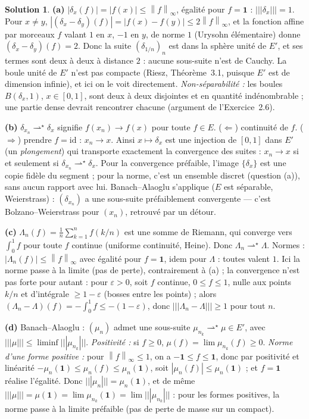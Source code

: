 \documentclass[11pt,a4paper]{article}
\newcommand{\norm}[1]{\left\|#1\right\|}
\newcommand{\opnorm}[1]{|\!|\!|#1|\!|\!|}
\newcommand{\wks}{\rightharpoonup^{\!\star}}
\theoremstyle{definition}
\newtheorem*{solution}{Solution}
\begin{document}
\begin{solution}
\noindent\textbf{(a)} $|\delta_x(f)|=|f(x)|\le\norm f_\infty$, égalité pour $f=\mathbf 1$ : $\opnorm{\delta_x}=1$. Pour $x\ne y$, $|(\delta_x-\delta_y)(f)|=|f(x)-f(y)|\le2\norm f_\infty$, et la fonction affine par morceaux $f$ valant $1$ en $x$, $-1$ en $y$, de norme $1$ (Urysohn élémentaire) donne $(\delta_x-\delta_y)(f)=2$. Donc la suite $(\delta_{1/n})_n$ est dans la sphère unité de $E'$, et ses termes sont deux à deux à distance $2$ : aucune sous-suite n'est de Cauchy. La boule unité de $E'$ n'est pas compacte (Riesz, Théorème~3.1, puisque $E'$ est de dimension infinie), et ici on le voit directement. \emph{Non-séparabilité :} les boules $B(\delta_x,1)$, $x\in[0,1]$, sont deux à deux disjointes et en quantité indénombrable ; une partie dense devrait rencontrer chacune (argument de l'Exercice~2.6).

\medskip
\noindent\textbf{(b)} $\delta_{x_n}\wks\delta_x$ signifie $f(x_n)\to f(x)$ pour toute $f\in E$. ($\Leftarrow$) continuité de $f$. ($\Rightarrow$) prendre $f=\mathrm{id}$ : $x_n\to x$. Ainsi $x\mapsto\delta_x$ est une injection de $[0,1]$ dans $E'$ (un \emph{plongement}) qui transporte exactement la convergence des suites : $x_n\to x$ si et seulement si $\delta_{x_n}\wks\delta_x$. Pour la convergence préfaible, l'image $\{\delta_x\}$ est une copie fidèle du segment ; pour la norme, c'est un ensemble discret (question (a)), sans aucun rapport avec lui. Banach--Alaoglu s'applique ($E$ est séparable, Weierstrass) : $(\delta_{x_n})$ a une sous-suite préfaiblement convergente — c'est Bolzano--Weierstrass pour $(x_n)$, retrouvé par un détour.

\medskip
\noindent\textbf{(c)} $\Lambda_n(f)=\frac1n\sum_{k=1}^nf(k/n)$ est une somme de Riemann, qui converge vers $\int_0^1f$ pour toute $f$ continue (uniforme continuité, Heine). Donc $\Lambda_n\wks\Lambda$. Normes : $|\Lambda_n(f)|\le\norm f_\infty$ avec égalité pour $f=\mathbf 1$, idem pour $\Lambda$ : toutes valent $1$. Ici la norme passe à la limite (pas de perte), contrairement à (a) ; la convergence n'est pas forte pour autant : pour $\varepsilon>0$, soit $f$ continue, $0\le f\le1$, nulle aux points $k/n$ et d'intégrale $\ge1-\varepsilon$ (bosses entre les points) ; alors $(\Lambda_n-\Lambda)(f)=-\int_0^1f\le-(1-\varepsilon)$, donc $\opnorm{\Lambda_n-\Lambda}\ge1$ pour tout $n$.

\medskip
\noindent\textbf{(d)} Banach--Alaoglu : $(\mu_n)$ admet une sous-suite $\mu_{n_k}\wks\mu\in E'$, avec $\opnorm\mu\le\liminf\opnorm{\mu_{n_k}}$. \emph{Positivité :} si $f\ge0$, $\mu(f)=\lim\mu_{n_k}(f)\ge0$. \emph{Norme d'une forme positive :} pour $\norm f_\infty\le1$, on a $-\mathbf 1\le f\le\mathbf 1$, donc par positivité et linéarité $-\mu_n(\mathbf 1)\le\mu_n(f)\le\mu_n(\mathbf 1)$, soit $|\mu_n(f)|\le\mu_n(\mathbf 1)$ ; et $f=\mathbf 1$ réalise l'égalité. Donc $\opnorm{\mu_n}=\mu_n(\mathbf 1)$, et de même $\opnorm\mu=\mu(\mathbf 1)=\lim\mu_{n_k}(\mathbf 1)=\lim\opnorm{\mu_{n_k}}$ : pour les formes positives, la norme passe à la limite préfaible (pas de perte de masse sur un compact).
\end{solution}
\end{document}

